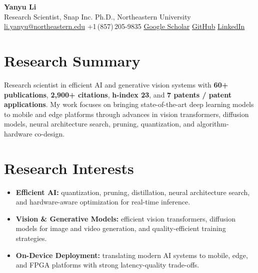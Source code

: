 \documentclass[11pt,letterpaper]{article}
\begin{document}
\begin{center}
    {\Huge\bfseries\color{headblue} Yanyu Li} \\[8pt]
    {\large Research Scientist, Snap Inc. \quad\textbar\quad Ph.D., Northeastern University} \\[6pt]
    \href{mailto:li.yanyu@northeastern.edu}{li.yanyu@northeastern.edu} \quad\textbar\quad
    +1\,(857)\,205-9835 \quad\textbar\quad
    \href{https://scholar.google.com/citations?user=XUj8koUAAAAJ\&hl=en}{Google Scholar} \quad\textbar\quad
    \href{https://github.com/liyy201912}{GitHub} \quad\textbar\quad
    \href{https://www.linkedin.com/in/yanyu-li-2216aa17b/}{LinkedIn}
\end{center}

\vspace{-4pt}

\section{Research Summary}

Research scientist in efficient AI and generative vision systems with \textbf{60+ publications}, \textbf{2,900+ citations}, \textbf{h-index 23}, and \textbf{7 patents / patent applications}. My work focuses on bringing state-of-the-art deep learning models to mobile and edge platforms through advances in vision transformers, diffusion models, neural architecture search, pruning, quantization, and algorithm-hardware co-design.

\section{Research Interests}

\begin{itemize}
    \item \textbf{Efficient AI:} quantization, pruning, distillation, neural architecture search, and hardware-aware optimization for real-time inference.
    \item \textbf{Vision \& Generative Models:} efficient vision transformers, diffusion models for image and video generation, and quality-efficient training strategies.
    \item \textbf{On-Device Deployment:} translating modern AI systems to mobile, edge, and FPGA platforms with strong latency-quality trade-offs.
\end{itemize}
\end{document}
